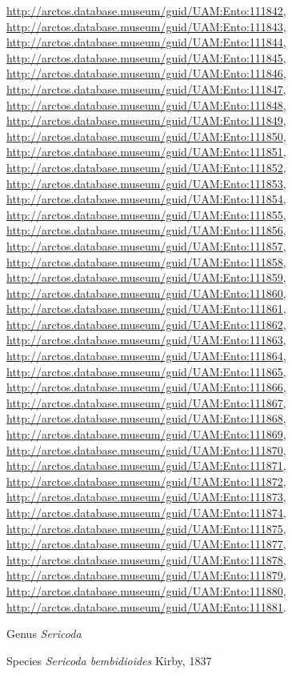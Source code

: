\documentclass[9pt, article]{memoir}
\begin{document}
\begin{multicols}{2}
\url{http://arctos.database.museum/guid/UAM:Ento:111842}, 
\url{http://arctos.database.museum/guid/UAM:Ento:111843}, 
\url{http://arctos.database.museum/guid/UAM:Ento:111844}, 
\url{http://arctos.database.museum/guid/UAM:Ento:111845}, 
\url{http://arctos.database.museum/guid/UAM:Ento:111846}, 
\url{http://arctos.database.museum/guid/UAM:Ento:111847}, 
\url{http://arctos.database.museum/guid/UAM:Ento:111848}, 
\url{http://arctos.database.museum/guid/UAM:Ento:111849}, 
\url{http://arctos.database.museum/guid/UAM:Ento:111850}, 
\url{http://arctos.database.museum/guid/UAM:Ento:111851}, 
\url{http://arctos.database.museum/guid/UAM:Ento:111852}, 
\url{http://arctos.database.museum/guid/UAM:Ento:111853}, 
\url{http://arctos.database.museum/guid/UAM:Ento:111854}, 
\url{http://arctos.database.museum/guid/UAM:Ento:111855}, 
\url{http://arctos.database.museum/guid/UAM:Ento:111856}, 
\url{http://arctos.database.museum/guid/UAM:Ento:111857}, 
\url{http://arctos.database.museum/guid/UAM:Ento:111858}, 
\url{http://arctos.database.museum/guid/UAM:Ento:111859}, 
\url{http://arctos.database.museum/guid/UAM:Ento:111860}, 
\url{http://arctos.database.museum/guid/UAM:Ento:111861}, 
\url{http://arctos.database.museum/guid/UAM:Ento:111862}, 
\url{http://arctos.database.museum/guid/UAM:Ento:111863}, 
\url{http://arctos.database.museum/guid/UAM:Ento:111864}, 
\url{http://arctos.database.museum/guid/UAM:Ento:111865}, 
\url{http://arctos.database.museum/guid/UAM:Ento:111866}, 
\url{http://arctos.database.museum/guid/UAM:Ento:111867}, 
\url{http://arctos.database.museum/guid/UAM:Ento:111868}, 
\url{http://arctos.database.museum/guid/UAM:Ento:111869}, 
\url{http://arctos.database.museum/guid/UAM:Ento:111870}, 
\url{http://arctos.database.museum/guid/UAM:Ento:111871}, 
\url{http://arctos.database.museum/guid/UAM:Ento:111872}, 
\url{http://arctos.database.museum/guid/UAM:Ento:111873}, 
\url{http://arctos.database.museum/guid/UAM:Ento:111874}, 
\url{http://arctos.database.museum/guid/UAM:Ento:111875}, 
\url{http://arctos.database.museum/guid/UAM:Ento:111877}, 
\url{http://arctos.database.museum/guid/UAM:Ento:111878}, 
\url{http://arctos.database.museum/guid/UAM:Ento:111879}, 
\url{http://arctos.database.museum/guid/UAM:Ento:111880}, 
\url{http://arctos.database.museum/guid/UAM:Ento:111881}.

\vspace{6pt}\noindent\hspace{30pt}Genus \textit{Sericoda}


\vspace{6pt}\noindent\hspace{36pt}Species \textit{Sericoda bembidioides} Kirby, 1837



\end{multicols}
\end{document}
